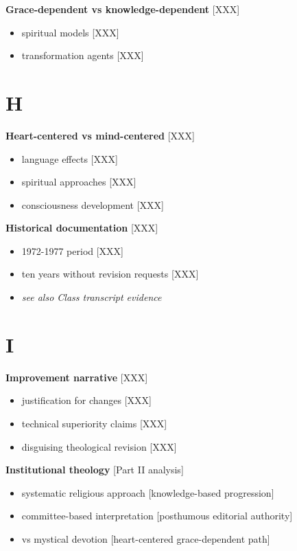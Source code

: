 \documentclass[11pt,twoside]{book}
\begin{document}
\textbf{\textbf{Grace-dependent vs knowledge-dependent}} {[}XXX]
\begin{itemize}
\item spiritual models [XXX]
\item transformation agents [XXX]
\end{itemize}
\section*{H}
\label{sec:orgb6c6162}

\textbf{\textbf{Heart-centered vs mind-centered}} {[}XXX]
\begin{itemize}
\item language effects [XXX]
\item spiritual approaches [XXX]
\item consciousness development [XXX]
\end{itemize}

\textbf{\textbf{Historical documentation}} {[}XXX]
\begin{itemize}
\item 1972-1977 period [XXX]
\item ten years without revision requests [XXX]
\item \emph{see also Class transcript evidence}
\end{itemize}
\section*{I}
\label{sec:orgbe6f8c8}

\textbf{\textbf{Improvement narrative}} {[}XXX]
\begin{itemize}
\item justification for changes [XXX]
\item technical superiority claims [XXX]
\item disguising theological revision [XXX]
\end{itemize}

\textbf{\textbf{Institutional theology}} {[}Part II analysis]
\begin{itemize}
\item systematic religious approach [knowledge-based progression]
\item committee-based interpretation [posthumous editorial authority]
\item vs mystical devotion [heart-centered grace-dependent path]
\end{itemize}
\end{document}
